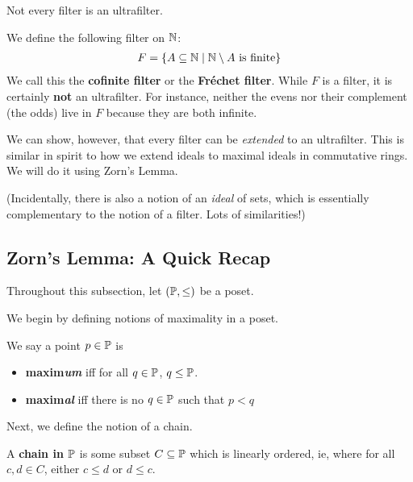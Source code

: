 Not every filter is an ultrafilter.

\begin{boxcexample}
    We define the following filter on $\N$:
    \begin{align*}
        F = \setst{A \ssq \N}{\N \setminus A \text{ is finite}}
    \end{align*}
    We call this the \textbf{cofinite filter} or the \textbf{Fréchet filter}. While $F$ is a filter, it is certainly \textbf{not} an ultrafilter. For instance, neither the evens nor their complement (the odds) live in $F$ because they are both infinite.
\end{boxcexample}

We can show, however, that every filter can be \textit{extended} to an ultrafilter. This is similar in spirit to how we extend ideals to maximal ideals in commutative rings. We will do it using Zorn's Lemma.

(Incidentally, there is also a notion of an \textit{ideal} of sets, which is essentially complementary to the notion of a filter. Lots of similarities!)

\subsection{Zorn's Lemma: A Quick Recap}

Throughout this subsection, let $\parenth{\P, \leq}$ be a poset.

We begin by defining notions of maximality in a poset.

\begin{boxdefinition}
    We say a point $p \in \P$ is
    \begin{itemize}
        \item \textbf{maxim\textit{um}} iff for all $q \in \P$, $q \leq \P$.
        \item \textbf{maxim\textit{al}} iff there is no $q \in \P$ such that $p < q$
    \end{itemize}
\end{boxdefinition}

Next, we define the notion of a chain.

\begin{boxdefinition}
    A \textbf{chain in $\P$} is some subset $C \ssq \P$ which is linearly ordered, ie, where for all $c, d \in C$, either $c \leq d$ or $d \leq c$.
\end{boxdefinition}

